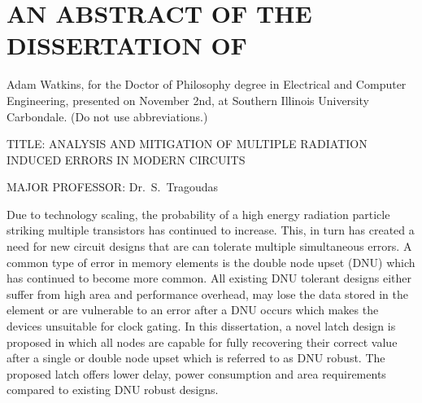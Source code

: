 


\chapter*{AN ABSTRACT OF THE DISSERTATION OF}

Adam Watkins, for the Doctor of Philosophy degree in Electrical and Computer Engineering,
presented on November 2nd, at Southern Illinois University Carbondale.
(Do not use abbreviations.)

\vspace{14pt}
\noindent
TITLE: ANALYSIS AND MITIGATION OF MULTIPLE RADIATION INDUCED ERRORS IN MODERN CIRCUITS

\vspace{14pt}

\noindent
MAJOR PROFESSOR: Dr.\ S.\ Tragoudas

\vspace{14pt}

Due to technology scaling, the probability of a high energy radiation particle striking multiple transistors has continued to increase. This, in turn has created a need for new circuit designs that are can tolerate multiple simultaneous errors. A common type of error in memory elements is the double node upset (DNU) which has continued to become more common. All existing DNU tolerant designs either suffer from high area and performance overhead, may lose the data stored in the element or are vulnerable to an error after a DNU occurs which makes the devices unsuitable for clock gating. In this dissertation, a novel latch design is proposed in which all nodes are capable for fully recovering their correct value after a single or double node upset which is referred to as DNU robust. The proposed latch offers lower delay, power consumption and area requirements compared to existing DNU robust designs.

